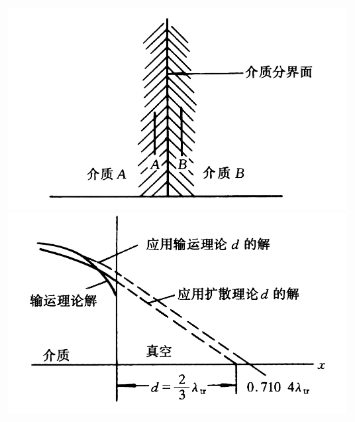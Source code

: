 \documentclass{Sichuan Normal University}
\begin{document}
\begin{itemize}
\begin{figure}[!t]
    \centering
    \begin{minipage}[c]{0.48\textwidth}
    \centering
    \includegraphics[width=0.8\textwidth]{./figure/在两种介质分界面上的中子扩散.png}
    \end{minipage}
    \hspace{0.02\textwidth}
    \begin{minipage}[c]{0.48\textwidth}
    \centering
    \includegraphics[width=0.8\textwidth]{./figure/应用输运理论和扩散理论的外推距离求得的扩散方程的解.png}
    \end{minipage}\\[3mm]
    \begin{minipage}[t]{0.48\textwidth}
    \centering
    \label{fig:在两种介质分界面上的中子扩散}
    \end{minipage}
    \hspace{0.02\textwidth}
    \begin{minipage}[t]{0.48\textwidth}
    \centering
    \label{fig:应用输运理论和扩散理论的外推距离求得的扩散方程的解}
    \end{minipage}
    \end{figure}
\end{itemize}
\end{document}
